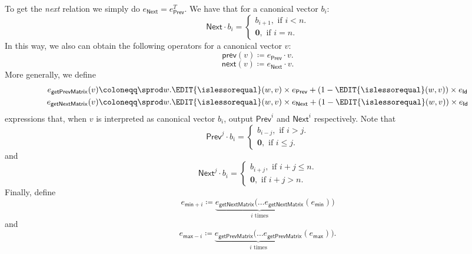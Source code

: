 To get the \textit{next} relation we simply do $e_{\mathsf{Next}} = e_{\mathsf{Prev}}^T$. We have that for a canonical vector $b_i$:
\[
{\mathsf{Next}}\cdot b_i=\begin{cases}
               b_{i+1}, \text{ if } i < n. \\
              \mathbf{0}, \text{ if } i = n.
            \end{cases}
\]
In this way, we also can obtain the following operators for a canonical vector $v$: 
$$\mathsf{prev}(v)\coloneqq e_{\mathsf{Prev}}\cdot v.$$
$$\mathsf{next}(v)\coloneqq e_{\mathsf{Next}}\cdot v.$$
More generally, we define 
\begin{align*}
    e_{\mathsf{getPrevMatrix}}(v)&\coloneqq \sprod w.  \EDIT{\islessorequal}(w,v)\times e_{\mathsf{Prev}} + (1 - \EDIT{\islessorequal}(w,v))\times e_{\mathsf{Id}}\\
    e_{\mathsf{getNextMatrix}}(v)&\coloneqq \sprod w. \EDIT{\islessorequal}(w,v)\times e_{\mathsf{Next}} + (1 - \EDIT{\islessorequal}(w,v))\times e_{\mathsf{Id}}
\end{align*}
expressions that, when $v$ is interpreted as canonical vector $b_i$, output $\mathsf{Prev}^i$ and $\mathsf{Next}^i$ respectively.
Note that
\[
\mathsf{Prev}^j\cdot b_i=\begin{cases}
               b_{i-j}, \text{ if } i > j. \\
              \mathbf{0}, \text{ if } i \leq j.
            \end{cases}
\]
and
\[
\mathsf{Next}^j\cdot b_i=\begin{cases}
               b_{i+j}, \text{ if } i + j \leq n. \\
              \mathbf{0}, \text{ if } i + j > n.
            \end{cases}
\]
Finally, define
$$
e_{\mathsf{min}+i}\coloneqq \underbrace{e_{\mathsf{getNextMatrix}}(\ldots e_{\mathsf{getNextMatrix}}}_{i \text{ times}}(e_{\mathsf{min}}))
$$
and
$$
e_{\mathsf{max}-i}\coloneqq \underbrace{e_{\mathsf{getPrevMatrix}}(\ldots e_{\mathsf{getPrevMatrix}}}_{i \text{ times}}(e_{\mathsf{max}})).
$$